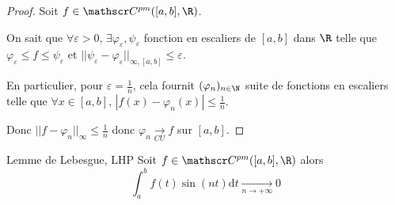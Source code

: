 \begin{proof}
    Soit $f \in \mathscr C^{pm}([a, b], \R)$. 

    On sait que $\forall \varepsilon > 0, \, \exists \varphi_\varepsilon, \psi_\varepsilon$ fonction en escaliers 
    de $[a, b]$ dans $\R$ telle que $\varphi_\varepsilon \leqslant f \leqslant \psi_\varepsilon$ et
    $||\psi_\varepsilon - \varphi_\varepsilon||_{\infty, [a, b]} \leqslant \varepsilon$.

    En particulier, pour $\varepsilon = \frac 1 n$, cela fournit $(\varphi_n)_{n \in \N}$ suite de 
    fonctions en escaliers telle que $\forall x \in [a, b], \, | f(x) - \varphi_n(x) | \leqslant \frac 1 n$.

    Donc $||f - \varphi_n||_\infty \leqslant \frac 1 n $ donc $\varphi_n \xrightarrow[CU]{} f$ sur $[a, b]$.
\end{proof}


\begin{proposition}{Lemme de Lebesgue, LHP}{}
    Soit $f \in \mathscr C^{pm}([a, b], \R)$ alors 
    $$\int_a^b f(t) \sin(nt) \mathrm d t \xrightarrow[n \to + \infty ]{} 0$$
\end{proposition}


